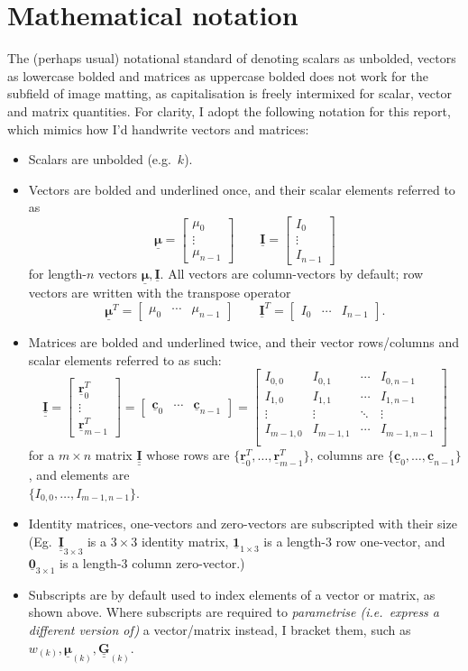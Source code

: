 \documentclass{article}
\newcommand{\bmat}[1]{\begin{bmatrix}#1\end{bmatrix}}
\theoremstyle{definition}
\def\vt#1{\underline{\mathbf{#1}}}
\def\vts#1{\underline{\boldsymbol{#1}}}
\def\mt#1{\underline{\underline{\mathbf{#1}}}}
\begin{document}
\section{Mathematical notation}\label{appendix:notation}
The (perhaps usual) notational standard of denoting scalars as unbolded, vectors as lowercase bolded and matrices as uppercase bolded does not work for the subfield of image matting, as capitalisation is freely intermixed for scalar, vector and matrix quantities. For clarity, I adopt the following notation for this report, which mimics how I'd handwrite vectors and matrices:
\begin{itemize}
    \item Scalars are unbolded (e.g.\ $k$).
    \item Vectors are bolded and underlined once, and their scalar elements referred to as
    $$\vts \mu = \bmat{\mu_0 \\ \vdots \\ \mu_{n-1}}  \qquad \vt I =\bmat{I_0 \\ \vdots \\ I_{n-1}}$$
    for length-$n$ vectors $\vts\mu, \vt I$. All vectors are column-vectors by default; row vectors are written with the transpose operator
    $$\vts\mu^T = \bmat{\mu_0 & \cdots & \mu_{n-1}} \qquad \vt I^T = \bmat{I_0 & \cdots & I_{n-1}}.$$
    \item Matrices are bolded and underlined twice, and their vector rows/columns and scalar elements referred to as such:
    $$\mt I = \bmat{\vt r_0^T \\ \vdots \\ \vt r_{m-1}^T } = \bmat{\vt c_0 & \cdots & \vt c_{n-1}} = \bmat{
        I_{0,0} & I_{0,1} & \cdots & I_{0,n-1} \\
        I_{1,0} & I_{1,1} & \cdots & I_{1,n-1} \\
        \vdots & \vdots  & \ddots & \vdots \\
        I_{m-1,0} & I_{m-1,1} & \cdots & I_{m-1,n-1} \\
    }$$
    for a $m\times n$ matrix $\mt I$ whose rows are $\{\vt r_0^T, \dots, \vt r_{m-1}^T\}$, columns are $\{\vt c_0, \dots, \vt c_{n-1}\}$, and elements are\\$\{I_{0,0}, \dots, I_{m-1,n-1}\}$.
    \item Identity matrices, one-vectors and zero-vectors are subscripted with their size (Eg.\ $\mt I_{3\times 3}$ is a $3\times 3$ identity matrix, $\vt{1}_{1\times 3}$ is a length-$3$ row one-vector, and $\vt{0}_{3\times 1}$ is a length-$3$ column zero-vector.)
    \item Subscripts are by default used to index elements of a vector or matrix, as shown above. Where subscripts are required to \emph{parametrise (i.e.\ express a different version of)} a vector/matrix instead, I bracket them, such as $w_{(k)}, \vts \mu_{(k)}, \mt G_{(k)}$.
\end{itemize}
\end{document}
